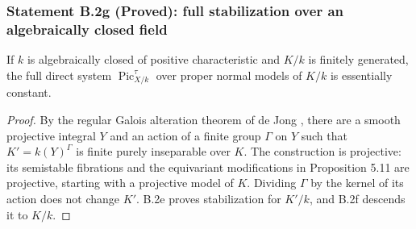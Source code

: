 \subsubsection*{Statement B.2g (Proved): full stabilization over an algebraically closed field}
If $k$ is algebraically closed of positive characteristic and
$K/k$ is finitely generated, the full direct system
$\operatorname{Pic}^{\tau}_{X/k}$ over proper normal models of
$K/k$ is essentially constant.
\begin{proof}
By the regular Galois alteration theorem of de Jong
\cite[Situation 5.3, Theorem 5.13 and Corollary 5.15, pp.~613, 619--620]{deJong1997},
there are a smooth projective integral $Y$ and an action of a
finite group $\Gamma$ on $Y$ such that
$K'=k(Y)^\Gamma$ is finite purely inseparable over $K$.
The construction is projective: its semistable fibrations and
the equivariant modifications in Proposition 5.11 are projective,
starting with a projective model of $K$.
Dividing $\Gamma$ by the kernel of its action does not change
$K'$.  B.2e proves stabilization for $K'/k$, and B.2f descends
it to $K/k$.
\end{proof}

